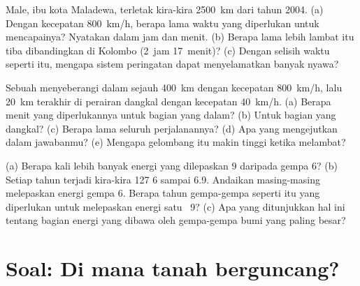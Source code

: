 \begin{exercise}[$\star\star$]\label{exo:g7:earthquakes:10}
Male, ibu kota Maladewa, terletak kira-kira \qty{2500}{km} dari 
 tahun 2004. (a) Dengan kecepatan \qty{800}{km/h}, berapa lama
waktu yang diperlukan  untuk mencapainya? Nyatakan dalam jam dan
menit. (b) Berapa lama lebih lambat  itu tiba dibandingkan di
Kolombo (2~jam 17~menit)? (c) Dengan selisih waktu seperti itu, mengapa
sistem peringatan dapat menyelamatkan banyak nyawa?
\end{exercise}

\begin{exercise}[$\star\star\star$]\label{exo:g7:earthquakes:11}
Sebuah  menyeberangi  dalam sejauh \qty{400}{km} dengan
kecepatan \qty{800}{km/h}, lalu \qty{20}{km} terakhir di perairan dangkal
dengan kecepatan \qty{40}{km/h}. (a) Berapa menit yang diperlukannya untuk
bagian yang dalam? (b) Untuk bagian yang dangkal? (c) Berapa lama seluruh
perjalanannya? (d) Apa yang mengejutkan dalam jawabanmu? (e) Mengapa
gelombang itu makin tinggi ketika melambat?
\end{exercise}

\begin{exercise}[$\star\star\star$]\label{exo:g7:earthquakes:12}
(a) Berapa kali lebih banyak energi yang dilepaskan  
9 daripada gempa  6? (b) Setiap tahun terjadi kira-kira 127
  6 sampai 6.9. Andaikan masing-masing melepaskan
energi gempa  6. Berapa tahun gempa-gempa seperti itu yang
diperlukan untuk melepaskan energi satu  ~9? (c) Apa
yang ditunjukkan hal ini tentang bagian energi yang dibawa oleh gempa-gempa
bumi yang paling besar?
\end{exercise}

\section{Soal: Di mana tanah berguncang?}


